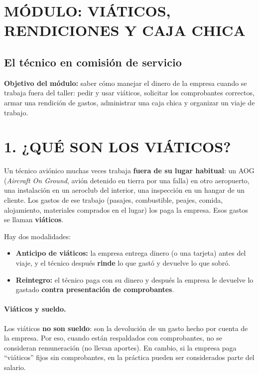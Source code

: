 \clearpage
\section*{MÓDULO: VIÁTICOS, RENDICIONES Y CAJA CHICA}
\subsection*{El técnico en comisión de servicio}

\begin{recuadro}
\textbf{Objetivo del módulo:} saber cómo manejar el dinero de la empresa cuando se trabaja
fuera del taller: pedir y usar viáticos, solicitar los comprobantes correctos, armar una
rendición de gastos, administrar una caja chica y organizar un viaje de trabajo.
\end{recuadro}

\section*{1. ¿QUÉ SON LOS VIÁTICOS?}

Un técnico aviónico muchas veces trabaja \textbf{fuera de su lugar habitual}: un AOG
(\textit{Aircraft On Ground}, avión detenido en tierra por una falla) en otro aeropuerto, una
instalación en un aeroclub del interior, una inspección en un hangar de un cliente. Los gastos
de ese trabajo (pasajes, combustible, peajes, comida, alojamiento, materiales comprados en el
lugar) los paga la empresa. Esos gastos se llaman \textbf{viáticos}.

Hay dos modalidades:
\begin{itemize}
  \item \textbf{Anticipo de viáticos:} la empresa entrega dinero (o una tarjeta) antes del
        viaje, y el técnico después \textbf{rinde} lo que gastó y devuelve lo que sobró.
  \item \textbf{Reintegro:} el técnico paga con su dinero y después la empresa le devuelve lo
        gastado \textbf{contra presentación de comprobantes}.
\end{itemize}

\paragraph*{Viáticos y sueldo.}
Los viáticos \textbf{no son sueldo}: son la devolución de un gasto hecho por cuenta de la
empresa. Por eso, cuando están respaldados con comprobantes, no se consideran remuneración (no
llevan aportes). En cambio, si la empresa paga ``viáticos'' fijos sin comprobantes, en la
práctica pueden ser considerados parte del salario.

